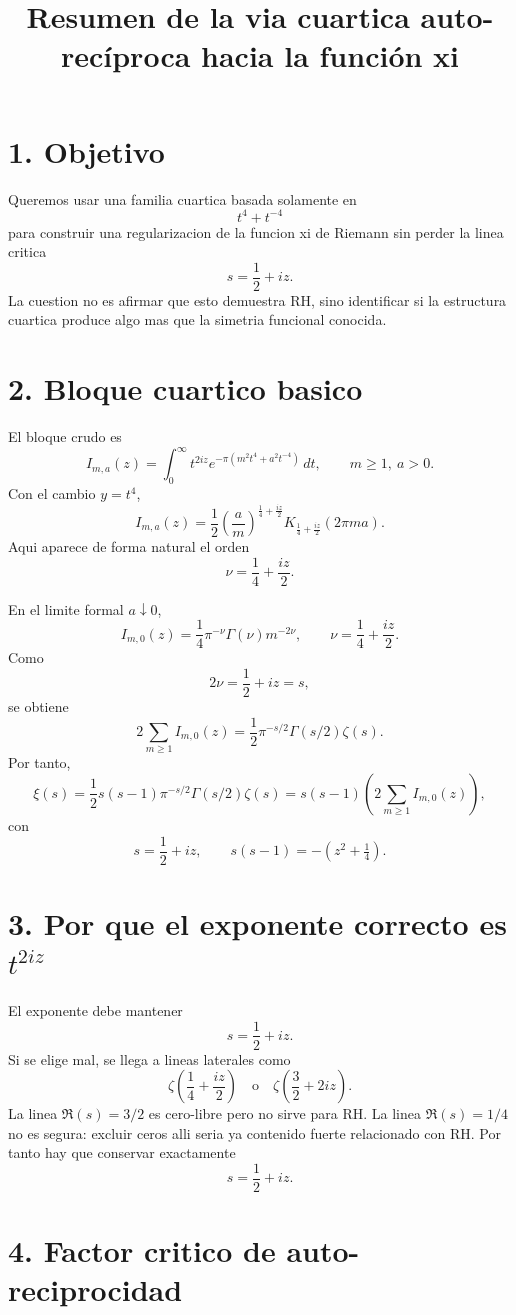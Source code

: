 \documentclass[11pt]{article}
\title{Resumen de la via cuartica auto-rec\'iproca hacia la funci\'on xi}
\author{}
\date{}
\begin{document}
\maketitle

\section*{1. Objetivo}

Queremos usar una familia cuartica basada solamente en
\[
t^4+t^{-4}
\]
para construir una regularizacion de la funcion xi de Riemann sin perder la
linea critica
\[
s=\frac12+iz.
\]
La cuestion no es afirmar que esto demuestra RH, sino identificar si la
estructura cuartica produce algo mas que la simetria funcional conocida.

\section*{2. Bloque cuartico basico}

El bloque crudo es
\[
I_{m,a}(z)
=
\int_0^\infty
t^{2iz}
e^{-\pi(m^2t^4+a^2t^{-4})}\,dt,
\qquad m\ge1,\ a>0.
\]
Con el cambio \(y=t^4\),
\[
I_{m,a}(z)
=
\frac12
\left(\frac{a}{m}\right)^{\frac14+\frac{iz}{2}}
K_{\frac14+\frac{iz}{2}}(2\pi ma).
\]
Aqui aparece de forma natural el orden
\[
\nu=\frac14+\frac{iz}{2}.
\]

En el limite formal \(a\downarrow0\),
\[
I_{m,0}(z)
=
\frac14
\pi^{-\nu}\Gamma(\nu)m^{-2\nu},
\qquad
\nu=\frac14+\frac{iz}{2}.
\]
Como
\[
2\nu=\frac12+iz=s,
\]
se obtiene
\[
2\sum_{m\ge1}I_{m,0}(z)
=
\frac12
\pi^{-s/2}\Gamma(s/2)\zeta(s).
\]
Por tanto,
\[
\xi(s)
=
\frac12s(s-1)\pi^{-s/2}\Gamma(s/2)\zeta(s)
=
s(s-1)\left(2\sum_{m\ge1}I_{m,0}(z)\right),
\]
con
\[
s=\frac12+iz,
\qquad
s(s-1)=-(z^2+\tfrac14).
\]

\section*{3. Por que el exponente correcto es \(t^{2iz}\)}

El exponente debe mantener
\[
s=\frac12+iz.
\]
Si se elige mal, se llega a lineas laterales como
\[
\zeta\left(\frac14+\frac{iz}{2}\right)
\quad\text{o}\quad
\zeta\left(\frac32+2iz\right).
\]
La linea \(\Re(s)=3/2\) es cero-libre pero no sirve para RH. La linea
\(\Re(s)=1/4\) no es segura: excluir ceros alli seria ya contenido fuerte
relacionado con RH. Por tanto hay que conservar exactamente
\[
s=\frac12+iz.
\]

\section*{4. Factor critico de auto-reciprocidad}
\end{document}
